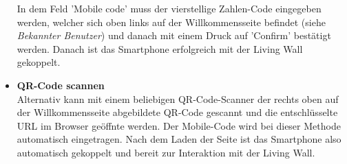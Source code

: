 \documentclass[10pt,a4paper]{report}
\begin{document}
\begin{itemize}
				In dem Feld 'Mobile code' muss der vierstellige Zahlen-Code eingegeben werden, welcher sich oben links auf der Willkommensseite befindet (siehe \textit{Bekannter Benutzer}) und danach mit einem Druck auf 'Confirm' bestätigt werden. Danach ist das Smartphone erfolgreich mit der Living Wall gekoppelt. \\
				\item \textbf{QR-Code scannen}\\
				Alternativ kann mit einem beliebigen QR-Code-Scanner der rechts oben auf der Willkommensseite abgebildete QR-Code gescannt und die entschlüsselte URL im Browser geöffnte werden. Der Mobile-Code wird bei dieser Methode automatisch eingetragen. Nach dem Laden der Seite ist das Smartphone also automatisch gekoppelt und bereit zur Interaktion mit der Living Wall.
			\end{itemize}
\end{document}
